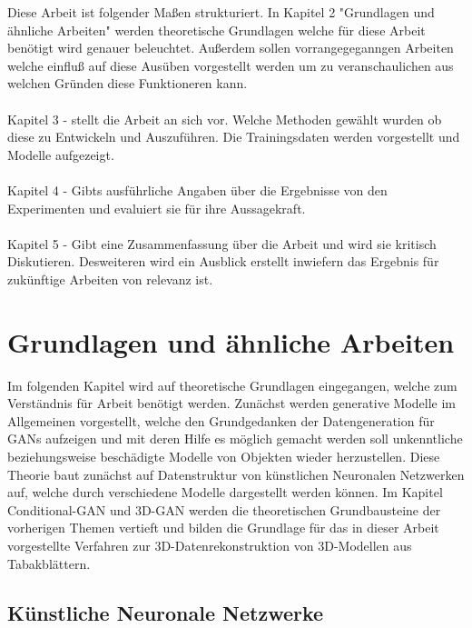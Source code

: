 \documentclass{llncs}
\begin{document}
Diese Arbeit ist folgender Maßen strukturiert. In Kapitel 2 "Grundlagen und ähnliche Arbeiten" werden theoretische Grundlagen welche für diese Arbeit benötigt wird genauer beleuchtet. Außerdem sollen vorrangegeganngen Arbeiten welche einfluß auf diese Ausüben vorgestellt werden um zu veranschaulichen aus welchen Gründen diese Funktioneren kann.
\\\\
Kapitel 3 - stellt die Arbeit an sich vor. Welche Methoden gewählt wurden ob diese zu Entwickeln und Auszuführen. Die Trainingsdaten werden vorgestellt und Modelle aufgezeigt.
\\\\
Kapitel 4 - Gibts  ausführliche Angaben über die Ergebnisse von den Experimenten und evaluiert sie für ihre Aussagekraft.
\\\\
Kapitel 5 - Gibt eine Zusammenfassung über die Arbeit und wird sie kritisch Diskutieren. Desweiteren wird ein Ausblick erstellt inwiefern das Ergebnis für zukünftige Arbeiten von relevanz ist. 

\section{Grundlagen und ähnliche Arbeiten}

Im folgenden Kapitel wird auf theoretische Grundlagen eingegangen, welche zum Verständnis für Arbeit benötigt werden. Zunächst werden  generative Modelle im Allgemeinen vorgestellt, welche den Grundgedanken der Datengeneration für GANs aufzeigen und mit deren Hilfe es möglich gemacht werden soll unkenntliche beziehungsweise beschädigte Modelle von Objekten wieder herzustellen. Diese Theorie baut zunächst auf Datenstruktur von künstlichen Neuronalen Netzwerken auf, welche durch verschiedene Modelle dargestellt werden können. Im Kapitel Conditional-GAN und 3D-GAN werden die theoretischen Grundbausteine der vorherigen Themen vertieft und bilden die Grundlage für das in dieser Arbeit vorgestellte Verfahren zur 3D-Datenrekonstruktion von 3D-Modellen aus Tabakblättern. 

\subsection{Künstliche Neuronale Netzwerke}
\end{document}
